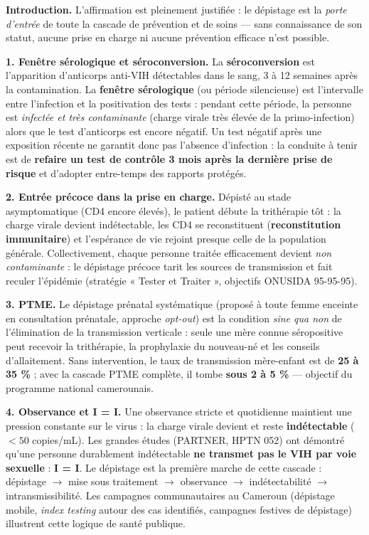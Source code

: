 \documentclass[11pt]{article}
\begin{document}
\begin{corrige}
\textbf{Introduction.} L'affirmation est pleinement justifiée : le dépistage est la \emph{porte d'entrée} de toute la cascade de prévention et de soins — sans connaissance de son statut, aucune prise en charge ni aucune prévention efficace n'est possible.

\textbf{1. Fenêtre sérologique et séroconversion.} La \textbf{séroconversion} est l'apparition d'anticorps anti-VIH détectables dans le sang, 3 à 12 semaines après la contamination. La \textbf{fenêtre sérologique} (ou période silencieuse) est l'intervalle entre l'infection et la positivation des tests : pendant cette période, la personne est \emph{infectée et très contaminante} (charge virale très élevée de la primo-infection) alors que le test d'anticorps est encore négatif. Un test négatif après une exposition récente ne garantit donc pas l'absence d'infection : la conduite à tenir est de \textbf{refaire un test de contrôle 3 mois après la dernière prise de risque} et d'adopter entre-temps des rapports protégés.

\textbf{2. Entrée précoce dans la prise en charge.} Dépisté au stade asymptomatique (CD4 encore élevés), le patient débute la trithérapie tôt : la charge virale devient indétectable, les CD4 se reconstituent (\textbf{reconstitution immunitaire}) et l'espérance de vie rejoint presque celle de la population générale. Collectivement, chaque personne traitée efficacement devient \emph{non contaminante} : le dépistage précoce tarit les sources de transmission et fait reculer l'épidémie (stratégie « Tester et Traiter », objectifs ONUSIDA 95-95-95).

\textbf{3. PTME.} Le dépistage prénatal systématique (proposé à toute femme enceinte en consultation prénatale, approche \emph{opt-out}) est la condition \emph{sine qua non} de l'élimination de la transmission verticale : seule une mère connue séropositive peut recevoir la trithérapie, la prophylaxie du nouveau-né et les conseils d'allaitement. Sans intervention, le taux de transmission mère-enfant est de \textbf{25 à 35 \%} ; avec la cascade PTME complète, il tombe \textbf{sous 2 à 5 \%} — objectif du programme national camerounais.

\textbf{4. Observance et I = I.} Une observance stricte et quotidienne maintient une pression constante sur le virus : la charge virale devient et reste \textbf{indétectable} ($< 50$ copies/mL). Les grandes études (PARTNER, HPTN 052) ont démontré qu'une personne durablement indétectable \textbf{ne transmet pas le VIH par voie sexuelle} : \textbf{I = I}. Le dépistage est la première marche de cette cascade : dépistage $\rightarrow$ mise sous traitement $\rightarrow$ observance $\rightarrow$ indétectabilité $\rightarrow$ intransmissibilité. Les campagnes communautaires au Cameroun (dépistage mobile, \emph{index testing} autour des cas identifiés, campagnes festives de dépistage) illustrent cette logique de santé publique.


\end{corrige}
\end{document}
